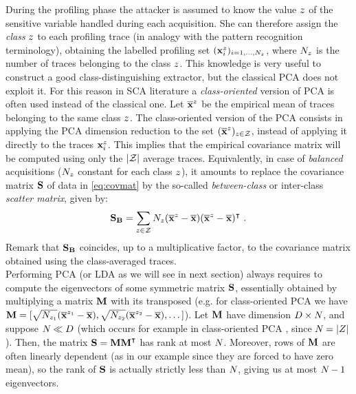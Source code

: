 During the profiling phase the attacker is assumed to know the value $\sensVar$ of the sensitive variable handled during each acquisition. She can therefore assign the {\em class} $\sensVar$ to each profiling trace  (in analogy with the pattern recognition terminology), obtaining the labelled profiling set $(\sss{i})_{i=1,\dots,\numTraces}$, where $\numTraces$ is the number of traces belonging to the class $\sensVar$. This knowledge is very useful to construct a good class-distinguishing extractor, but the classical PCA does not exploit it. For this reason in SCA literature \cite{TAprincipal,choudaryefficient,choudary2014efficient,disassembler,Standaert2008}  a {\em class-oriented} version of PCA is often used instead of the classical one. Let $\mmmXclass$ be the empirical mean of traces belonging to the same class $\sensVar$. The class-oriented version of the PCA  consists in applying the PCA dimension reduction to the set $(\mmmXclass)_{\sensVar \in \sensVarSet}$, instead of applying it directly to the traces $\sss{i}$. This implies that the empirical covariance matrix will be computed using only the $\lvert \sensVarSet \rvert$ average traces. Equivalently, in case of \textit{balanced} acquisitions ($\numTraces$ constant for each class $\sensVar$), it amounts to replace the covariance matrix $\covmat$ of data in \eqref{eq:covmat}  by the so-called {\em between-class} or inter-class {\em scatter matrix}, given by:
\begin{equation}\label{eq:SB}
\SB = \sum_{\sensVar\in\sensVarSet}\numTraces(\mmmXclass-\mmmX)(\mmmXclass-\mmmX)^\intercal \mbox{ .}
\end{equation}
Remark that $\SB$ coincides, up to a multiplicative factor, to the covariance matrix obtained using the class-averaged traces.\\

Performing PCA (or LDA as we will see in next section) always requires to compute the eigenvectors of some symmetric matrix $\covmat$, essentially obtained by multiplying a matrix $\measuresMatrix$ with its transposed (e.g. for class-oriented PCA we have $\measuresMatrix = [\sqrt{\numTraces[\sensVar_1]}(\mmmXclass[\sensVar_1]-\mmmX),\sqrt{\numTraces[\sensVar_2]}(\mmmXclass[\sensVar_2]-\mmmX), \dots ]$). Let $\measuresMatrix$ have dimension $\traceLength\times\numTraces[]$, and suppose $\numTraces[]\ll \traceLength$ (which occurs for example in class-oriented PCA , since $\numTraces[]=\lvert \sensRandVar \rvert$). Then, the matrix $\covmat=\measuresMatrix\measuresMatrix^\intercal$ has rank at most $\numTraces[]$. Moreover, rows of $\measuresMatrix$ are often linearly dependent (as in our example since they are forced to have zero mean), so the rank of $\covmat$ is actually strictly less than $\numTraces[]$, giving us at most $\numTraces[]-1$ eigenvectors.\\

